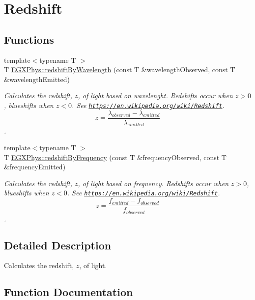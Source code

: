 \hypertarget{group___e_g_x_phys-_redshift}{}\section{Redshift}
\label{group___e_g_x_phys-_redshift}
\subsection*{Functions}
\begin{DoxyCompactItemize}
\item 
{\footnotesize template$<$typename T $>$ }\\T \hyperlink{group___e_g_x_phys-_redshift_ga29300a13e34da35332ca2d447b5ce82d}{E\+G\+X\+Phys\+::redshift\+By\+Wavelength} (const T \&wavelength\+Observed, const T \&wavelength\+Emitted)
\begin{DoxyCompactList}\small\item\em Calculates the redshift, $z$, of light based on wavelenght. Redshifts occur when $z > 0$, blueshifts when $z < 0$. See \href{https://en.wikipedia.org/wiki/Redshift}{\tt https\+://en.\+wikipedia.\+org/wiki/\+Redshift}. \[z=\frac{\lambda_{observed}-\lambda_{emitted}}{\lambda_{emitted}}\]. \end{DoxyCompactList}\item 
{\footnotesize template$<$typename T $>$ }\\T \hyperlink{group___e_g_x_phys-_redshift_gacc6d3b2922061214d64b89a4b8e3967a}{E\+G\+X\+Phys\+::redshift\+By\+Frequency} (const T \&frequency\+Observed, const T \&frequency\+Emitted)
\begin{DoxyCompactList}\small\item\em Calculates the redshift, $z$, of light based on frequency. Redshifts occur when $z > 0$, blueshifts when $z < 0$. See \href{https://en.wikipedia.org/wiki/Redshift}{\tt https\+://en.\+wikipedia.\+org/wiki/\+Redshift}. \[z=\frac{f_{emitted}-f_{observed}}{f_{observed}}\]. \end{DoxyCompactList}\end{DoxyCompactItemize}


\subsection{Detailed Description}
Calculates the redshift, $z$, of light. 

\subsection{Function Documentation}
\mbox{\label{group___e_g_x_phys-_redshift_gacc6d3b2922061214d64b89a4b8e3967a}} 
